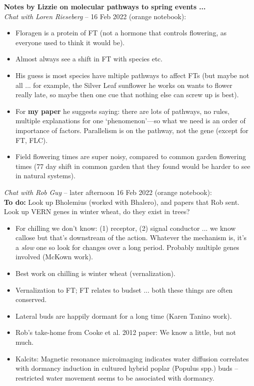 \documentclass[11pt,letter]{article}
\begin{document}
 
 

{\bf Notes by Lizzie on molecular pathways to spring events ...} \\

\emph{Chat with Loren Rieseberg} -- 16 Feb 2022 (orange notebook):
\begin{itemize}
\item  Floragen is a protein of FT (not a hormone that controls flowering, as everyone used to think it would be).
\item  Almost always see a shift in FT with species etc.
\item  His guess is most species have mltiple pathways to affect FTs (but maybe not all ... for example, the Silver Leaf sunflower he works on wants to flower really late, so maybe then one cue that nothing else can screw up is best). 
\item  For {\bf my paper} he suggests saying: there are lots of pathways, no rules, multiple explanations for one `phenomenon'---so what we need is an order of importance of factors. Parallelism is on the pathway, not the gene (except for FT, FLC). 
\item  Field flowering times are super noisy, compared to common garden flowering times (77 day shift in common garden that they found would be harder to see in natural systems).
\end{itemize}

\emph{Chat with Rob Guy} -- later afternoon 16 Feb 2022 (orange notebook):\\

{\bf To  do:} Look up Bholemius (worked with Bhalero), and papers that Rob sent. Look up VERN genes in winter wheat, do they exist in trees?\\
\begin{itemize}
\item  For chilling we don't know: (1) receptor, (2) signal conductor ... we know callose but that's downstream of the action. Whatever the mechanism is, it's a \emph{slow} one so look for changes over a long period. Probably multiple genes involved (McKown work).
\item  Best work on chilling is winter wheat (vernalization). 
\item  Vernalization to FT; FT relates to budset ... both these things are often conserved.
\item  Lateral buds are happily dormant for a long time (Karen Tanino work). 
\item  Rob's take-home from Cooke et al. 2012 paper: We know a little, but not much.
\item  Kalcits: Magnetic resonance microimaging indicates water diffusion correlates with dormancy induction in cultured hybrid poplar
(Populus spp.) buds -- restricted water movement seems to be associated with dormancy.
\end{itemize}
\end{document}
